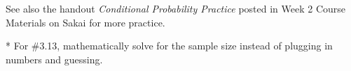 \documentclass[12pt]{article}
\begin{document}

See also the handout \textit{Conditional Probability Practice} posted in Week 2 Course Materials on Sakai for more practice. 

\bigskip

* For \#3.13, mathematically solve for the sample size instead of plugging in numbers and guessing.

%

%




\end{document}
